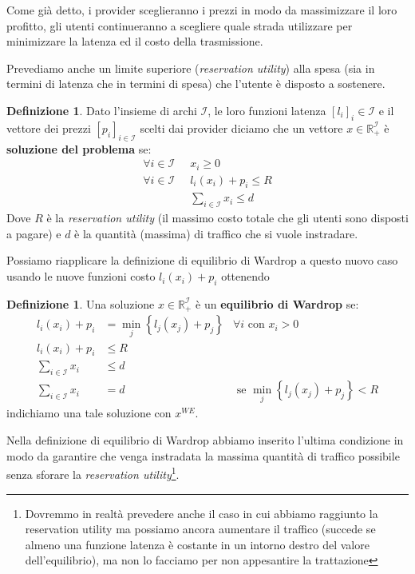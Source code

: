 \documentclass[a4paper]{article}
\theoremstyle{plain}
\theoremstyle{definition}
\newtheorem{mydef}[myteo]{Definizione}
\theoremstyle{remark}
\newcommand{\set}[1]{\left\{#1\right\}}
\newcommand{\pa}[1]{\left(#1\right)}
\newcommand{\bra}[1]{\left[#1\right]}
\begin{document}
Come già detto, i provider sceglieranno i prezzi in modo da
massimizzare il loro profitto, gli utenti continueranno a scegliere
quale strada utilizzare per minimizzare la latenza ed il costo della
trasmissione.

Prevediamo anche un limite superiore (\textit{reservation utility})
alla spesa (sia in termini di latenza che in termini di spesa) che
l'utente è disposto a sostenere.

\begin{mydef}
  Dato l'insieme di archi $\mathcal{I}$, le loro funzioni
  latenza $\bra{l_i}_i\in\mathcal{I}$ e il vettore dei prezzi
  $\bra{p_i}_{i\in\mathcal{I}}$ scelti dai provider diciamo che un
  vettore $x\in \mathbb{R}_+^\mathcal{I}$ è \textbf{soluzione del
    problema} se:
  \begin{align*}
    \forall i\in \mathcal{I}\;\; & x_i \ge 0 \\
    \forall i\in \mathcal{I}\;\; & l_i(x_i) + p_i \le R \\
    & \sum _{i\in \mathcal{I}} x_i \le d 
  \end{align*}
  Dove $R$ è la \textit{reservation utility} (il massimo costo totale
  che gli utenti sono disposti a pagare) e $d$ è la quantità (massima)
  di traffico che si vuole instradare.
\end{mydef}

Possiamo riapplicare la definizione di equilibrio di Wardrop a questo
nuovo caso usando le nuove funzioni costo $l_i\pa{x_i} + p_i$ ottenendo

\begin{mydef}
  Una soluzione $x\in \mathbb{R}_+^\mathcal{I}$ è un
  \textbf{equilibrio di Wardrop} se:
  \begin{align*}
    l_i(x_i) + p_i &= \min _j \set{l_j(x_j)+p_j} & \forall i\text{ con } x_i>0 \\
    l_i(x_i) + p_i &\le R \\
    \sum _{i\in \mathcal{I}} x_i &\le d \\
    \sum _{i\in \mathcal{I}} x_i &= d & \text { se } \min _j
                                        \set{l_j(x_j)+p_j} <R
  \end{align*}
  indichiamo una tale soluzione con $x^{WE}$.
\end{mydef}

Nella definizione di equilibrio di Wardrop abbiamo inserito l'ultima
condizione in modo da garantire che venga instradata la massima
quantità di traffico possibile senza sforare la \textit{reservation
  utility}\footnote{Dovremmo in realtà prevedere anche il caso in cui
  abbiamo raggiunto la reservation utility ma possiamo ancora
  aumentare il traffico (succede se almeno una funzione latenza è
  costante in un intorno destro del valore dell'equilibrio), ma non lo
  facciamo per non appesantire la trattazione}.
\end{document}

